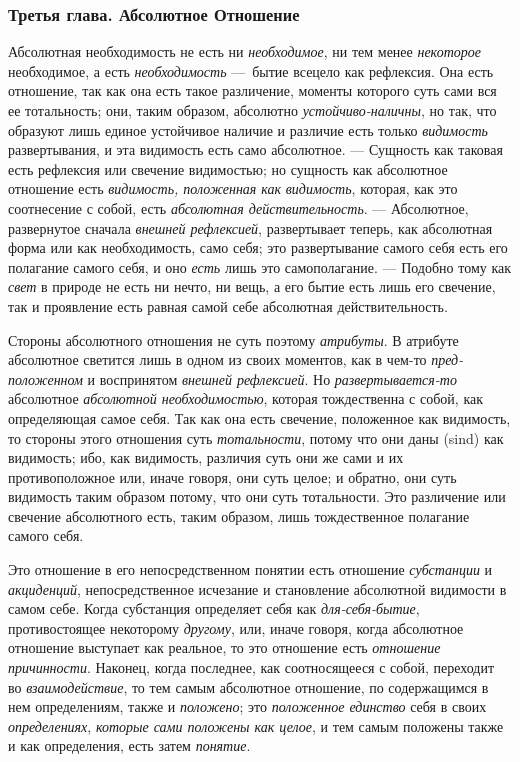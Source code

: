 \subsubsection{Третья глава. Абсолютное Отношение}
Абсолютная необходимость не есть ни
{\em необходимое}, ни тем менее
{\em некоторое} необходимое, а есть
{\em необходимость} —~бытие всецело как рефлексия. Она
есть отношение, так как она есть такое различение, моменты которого суть
сами вся ее тотальность; они, таким образом, абсолютно
{\em устойчиво-наличны}, но так, что образуют лишь
единое устойчивое наличие и различие есть только
{\em видимость} развертывания, и эта видимость есть
само абсолютное. — Сущность как таковая есть рефлексия или свечение
видимостью; но сущность как абсолютное отношение есть
{\em видимость, положенная как
}{\em видимость}, которая, как это соотнесение с собой,
есть {\em абсолютная действительность}. — Абсолютное,
развернутое сначала {\em внешней рефлексией},
развертывает теперь, как абсолютная форма или как необходимость, само себя;
это развертывание самого себя есть его полагание самого себя, и оно
{\em есть} лишь это самополагание. — Подобно тому как
{\em свет} в природе не есть ни нечто, ни вещь, а его
бытие есть лишь его свечение, так и проявление есть равная самой себе
абсолютная действительность.

Стороны абсолютного отношения не суть поэтому
{\em атрибуты}. В атрибуте абсолютное светится лишь в
одном из своих моментов, как в чем-то
{\em пред-положенном} и воспринятом
{\em внешней рефлексией}. Но
{\em развертывается-то} абсолютное
{\em абсолютной необходимостью}, которая тождественна с
собой, как определяющая самое себя. Так как она есть свечение, положенное
как видимость, то стороны этого отношения суть
{\em тотальности}, потому что они даны (sind) как
видимость; ибо, как видимость, различия суть они же сами и их
противоположное или, иначе говоря, они суть целое; и обратно, они суть
видимость таким образом потому, что они суть тотальности. Это различение
или свечение абсолютного есть, таким образом, лишь тождественное полагание
самого себя.

Это отношение в его непосредственном понятии есть отношение
{\em субстанции} и
{\em акциденций}, непосредственное исчезание и
становление абсолютной видимости в самом себе. Когда субстанция определяет
себя как {\em для-себя-бытие}, противостоящее
некоторому {\em другому}, или, иначе говоря, когда
абсолютное отношение выступает как реальное, то это отношение есть
{\em отношение причинности}. Наконец, когда последнее,
как соотносящееся с собой, переходит во
{\em взаимодействие}, то тем самым абсолютное
отношение, по содержащимся в нем определениям, также и
{\em положено}; это {\em положенное
единство} себя в своих {\em определениях},
{\em которые сами положены как целое}, и тем самым
положены также и как определения, есть затем
{\em понятие}.


